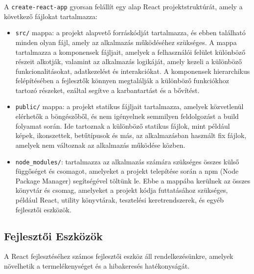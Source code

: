 \documentclass[colorlinks]{thesis-kando}
\theoremstyle{definition}
\theoremstyle{remark}
\begin{document}
\pagebreak

A \texttt{create-react-app} gyorsan felállít egy alap React projektstruktúrát, amely a következő fájlokat tartalmazza:
\begin{itemize}
    \item \texttt{src/} mappa: a projekt alapvető forráskódját tartalmazza, és ebben található minden olyan fájl, amely az alkalmazás működéséhez szükséges. A mappa tartalmazza a komponensek fájljait, amelyek a felhasználói felület különböző részeit alkotják, valamint az alkalmazás logikáját, amely kezeli a különböző funkcionalitásokat, adatkezelést és interakciókat. A komponensek hierarchikus felépítésében a fejlesztők könnyen megtalálják a különböző funkciókhoz tartozó részeket, ezáltal segítve a karbantartást és a bővítést.
    \item \texttt{public/} mappa: a projekt statikus fájljait tartalmazza, amelyek közvetlenül elérhetők a böngészőből, és nem igényelnek semmilyen feldolgozást a build folyamat során. Ide tartoznak a különböző statikus fájlok, mint például képek, ikonszettek, betűtípusok és más, az alkalmazásban használt fix fájlok, amelyek nem változnak az alkalmazás működése közben.
    \item \texttt{node\_modules/}: tartalmazza az alkalmazás számára szükséges összes külső függőséget és csomagot, amelyeket a projekt telepítése során a npm (Node Package Manager) segítségével töltünk le. Ebbe a mappába kerülnek az összes könyvtár és csomag, amelyeket a projekt kódja futtatásához szükséges, például React, utility könyvtárak, tesztelési keretrendszerek, és egyéb fejlesztői eszközök.
\end{itemize}

\subsection{Fejlesztői Eszközök}
A React fejlesztéséhez számos fejlesztői eszköz áll rendelkezésünkre, amelyek növelhetik a termelékenységet és a hibakeresés hatékonyságát.
\end{document}
